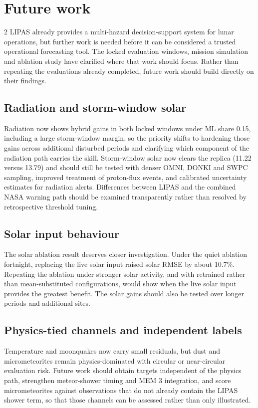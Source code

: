 \section{Future work}
\begin{multicols}{2}
LIPAS already provides a multi-hazard decision-support system for lunar operations, but further work is needed before it can be considered a trusted operational forecasting tool. The locked evaluation windows, mission simulation and ablation study have clarified where that work should focus. Rather than repeating the evaluations already completed, future work should build directly on their findings.

\subsection{Radiation and storm-window solar}

Radiation now shows hybrid gains in both locked windows under ML share 0.15, including a large storm-window margin, so the priority shifts to hardening those gains across additional disturbed periods and clarifying which component of the radiation path carries the skill. Storm-window solar now clears the replica (11.22 versus 13.79) and should still be tested with denser OMNI, DONKI and SWPC sampling, improved treatment of proton-flux events, and calibrated uncertainty estimates for radiation alerts. Differences between LIPAS and the combined NASA warning path should be examined transparently rather than resolved by retrospective threshold tuning.

\subsection{Solar input behaviour}

The solar ablation result deserves closer investigation. Under the quiet ablation fortnight, replacing the live solar input raised solar RMSE by about 10.7\%. Repeating the ablation under stronger solar activity, and with retrained rather than mean-substituted configurations, would show when the live solar input provides the greatest benefit. The solar gains should also be tested over longer periods and additional sites.

\subsection{Physics-tied channels and independent labels}

Temperature and moonquakes now carry small residuals, but dust and micrometeorites remain physics-dominated with circular or near-circular evaluation risk. Future work should obtain targets independent of the physics path, strengthen meteor-shower timing and MEM 3 integration, and score micrometeorites against observations that do not already contain the LIPAS shower term, so that those channels can be assessed rather than only illustrated.


\end{multicols}
